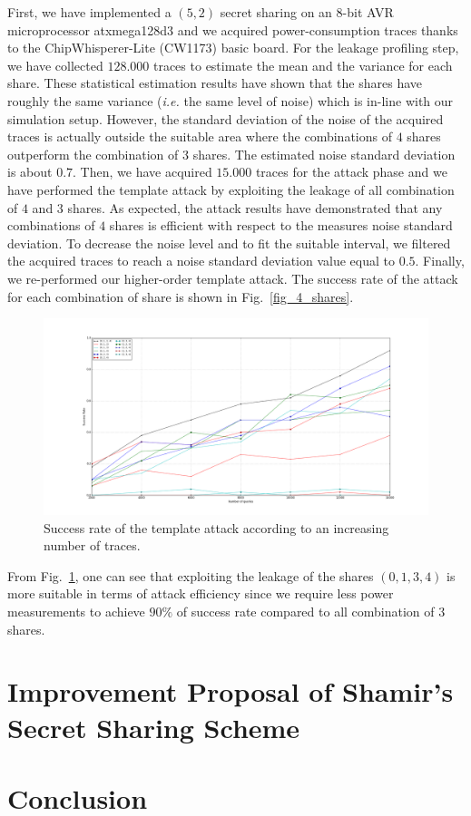 \documentclass{llncs}
\begin{document}
First, we have implemented a $(5,2)$ secret sharing on an $8$-bit AVR microprocessor atxmega128d3 and we acquired power-consumption traces thanks to the ChipWhisperer-Lite (CW1173) basic board. For the leakage profiling step, we have collected $128.000$ traces to estimate the mean and the variance for each share. These statistical estimation results have shown that the shares have roughly the same variance (\emph{i.e.} the same level of noise) which is in-line with our simulation setup. However, the standard deviation of the noise of the acquired traces is actually outside the suitable area where the combinations of $4$ shares outperform the combination of $3$ shares. The estimated noise standard deviation is about $0.7$.
Then, we have acquired $15.000$ traces for the attack phase and we have performed the template attack by exploiting the leakage of all combination of $4$ and $3$ shares. As expected, the attack results have demonstrated that any combinations of $4$ shares is efficient with respect to the measures noise standard deviation. To decrease the noise level and to fit the suitable interval, we filtered the acquired traces to reach a noise standard deviation value equal to $0.5$. Finally, we re-performed our higher-order template attack. The success rate of the attack for each combination of share is shown in Fig.~\ref{fig_4_shares}.    

\begin{figure}
\begin{center}
\includegraphics[width=1\textwidth]{Figure/SR.png}
\caption{Success rate of the template attack according to an increasing number of traces.}
\label{fig_SR}
\end{center}
\end{figure}

From Fig.~\ref{fig_SR}, one can see that exploiting the leakage of the shares $(0, 1, 3, 4)$ is more suitable in terms of attack efficiency since we require less power measurements to achieve $90\%$ of success rate compared to all combination of $3$ shares. 



\section{Improvement Proposal of Shamir's Secret Sharing Scheme}
 \todo{}


\section{Conclusion}
\label{sec-conc}
 \todo{}
 
%
%



\printbibliography
\end{document}

